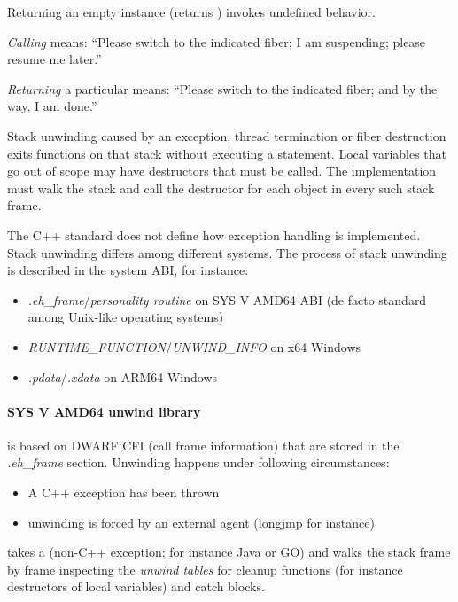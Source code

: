 Returning an empty \fiber instance (\opbool returns ) invokes
undefined behavior.

\emph{Calling} \resume means: ``Please switch to the indicated fiber; I
am suspending; please resume me later.''

\emph{Returning} a particular \fiber means: ``Please switch to the indicated
fiber; and by the way, I am done.''


\label{unwinding}

Stack unwinding caused by an exception, thread termination or fiber
destruction exits functions on that stack without executing a  statement. Local variables
that go out of scope may have destructors that must be called.
The implementation must walk the stack and call the destructor for each object
in every such stack frame.

The C++ standard does not define how exception handling is implemented. Stack unwinding differs
among different systems. The process of stack unwinding is described in the
system ABI, for instance:
\begin{itemize}
    \item \emph{.eh\_frame}/\emph{personality routine} on SYS V AMD64 ABI\cite{SYSVAMD64} (de facto standard among Unix-like operating systems)
    \item \emph{RUNTIME\_FUNCTION}/\emph{UNWIND\_INFO} on x64 Windows\cite{WinX64}
    \item \emph{.pdata}/\emph{.xdata} on ARM64 Windows\cite{WinARM64}
\end{itemize}

\paragraph{SYS V AMD64 unwind library}
is based on DWARF CFI (call frame information) that are stored in the \emph{.eh\_frame} section.
Unwinding happens under following circumstances:
\begin{itemize}
    \item A C++ exception has been thrown
    \item unwinding is forced by an external agent (longjmp for instance)
\end{itemize}
\uwforced takes a \foreignex (non-C++ exception; for instance Java or GO) and walks the stack frame by frame
inspecting the \emph{unwind tables} for cleanup functions (for instance destructors of
local variables) and catch blocks.

